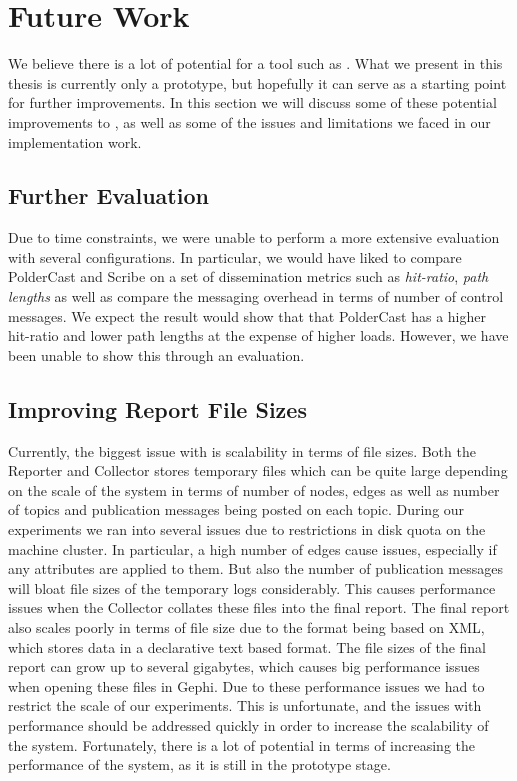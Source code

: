 \section{Future Work}

We believe there is a lot of potential for a tool such as \demo{}. What
we present in this thesis is currently only a prototype, but hopefully
it can serve as a starting point for further improvements. In this
section we will discuss some of these potential improvements to \demo{},
as well as some of the issues and limitations we faced in our implementation work.

\subsection{Further Evaluation}

Due to time constraints, we were unable to perform a more extensive
evaluation with several configurations. In particular, we would have
liked to compare PolderCast and Scribe on a set of dissemination metrics
such as \emph{hit-ratio}, \emph{path lengths} as well as compare the messaging
overhead in terms of number of control messages. We expect the result
would show that that PolderCast has a higher hit-ratio and lower path
lengths at the expense of higher loads. However, we have been unable to
show this through an evaluation.

\subsection{Improving Report File Sizes}

Currently, the biggest issue with \demo{} is scalability in terms of
file sizes. Both the Reporter and Collector stores temporary files
which can be quite large depending on the scale of the system in terms
of number of nodes, edges as well as number of topics and publication
messages being posted on each topic. During our experiments we ran into
several issues due to restrictions in disk quota on the machine cluster.
In particular, a high number of edges cause issues, especially if any
attributes are applied to them. But also the number of publication
messages will bloat file sizes of the temporary logs considerably. This
causes performance issues when the Collector collates these files into
the final report. The final report also scales poorly in terms of file
size due to the \gexf{} format being based on XML, which stores data in
a declarative text based format. The file sizes of the final report can
grow up to several gigabytes, which causes big performance issues when
opening these files in Gephi. Due to these performance issues we had to
restrict the scale of our experiments. This is unfortunate, and the
issues with performance should be addressed quickly in order to increase
the scalability of the system. Fortunately, there is a lot of
potential in terms of increasing the performance of the system,
as it is still in the prototype stage.

